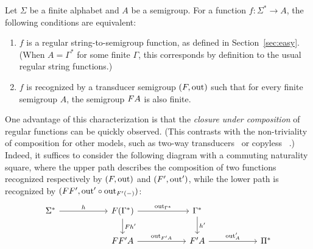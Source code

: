 
\begin{theorem}\label{thm:regular-functions}
    Let $\Sigma$ be a finite alphabet and $A$ be a semigroup. For a function $f : \Sigma^* \to A$, the following conditions are equivalent:
    \begin{enumerate}
        \item \label{it:regular} $f$ is  a regular string-to-semigroup function, as defined in Section~\ref{sec:easy}. (When $A = \Gamma^*$ for some finite $\Gamma$, this corresponds by definition to the usual regular string functions.)
        \item \label{it:trans-semig-regular}$f$ is recognized by a transducer semigroup $(\functor,\outfun)$ such that for every finite semigroup $A$, the semigroup $\functor A$ is also finite. 
    \end{enumerate}
\end{theorem}
\begin{remark}\label{rem:composition}
    One advantage of this characterization is that the \emph{closure under composition} of regular functions can be quickly observed. (This contrasts with the non-triviality of composition for other models, such as two-way transducers~\cite{ChytilJ77} or copyless \sst~\cite{composingSST}.)
    Indeed, it suffices to consider the following diagram with a commuting naturality square, where the upper path describes the composition of two functions recognized respectively by $(\functor,\outfun)$ and $(\functor',\outfun')$, while the lower path is recognized by $(\functor\functor',\outfun'\circ\outfun_{F'(-)})$:
    \[
    \begin{tikzcd}
        [column sep=2cm]
        \Sigma^* 
        \ar[r,"h"]
        & 
        \functor(\Gamma^*)
        \ar[r,"\outfun_{\Gamma^*}"]
        \ar[d,"\functor h'"]
        &
        \Gamma^* \ar[d,"h'"]\\
        &
        \functor\functor'A \ar[r,"\outfun_{\functor'A}"]
        & 
        \functor'A
        \ar[r,"\outfun'_A"]
        &
        \Pi^*
    \end{tikzcd}
    \]
\end{remark}

